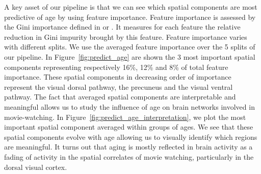 A key asset of our pipeline is that we can see which spatial components are most predictive of age by using feature importance.
%
Feature importance is assessed by the Gini importance defined in \cite{breiman2001random} or \cite{louppe2013understanding}.
%
It measures for each feature the relative reduction in Gini impurity brought by this feature.
%
Feature importance varies with different splits. We use the averaged feature importance over the 5 splits of our pipeline.
%
In Figure~\ref{fig:predict_age} are shown the 3 most important spatial components representing respectively 16\%, 12\% and 8\% of total feature importance.
%
These spatial components in decreasing order of importance represent the visual dorsal pathway, the precuneus and the visual ventral pathway. 
%
The fact that averaged spatial components are interpretable and meaningful allows us to study the influence of age on brain networks involved in movie-watching.
%
In Figure~\ref{fig:predict_age_interpretation}, we plot the most important spatial component averaged within groups of ages.
%
We see that these spatial components evolve with age allowing us to visually identify which regions are meaningful. 
%
It turns out that aging is mostly reflected in brain activity as a
fading of activity in the spatial correlates of movie watching,
particularly in the dorsal visual cortex.


